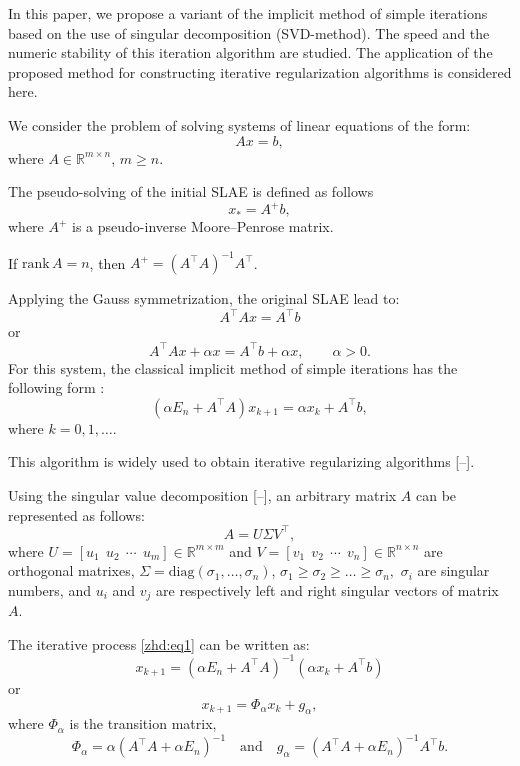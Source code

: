 In this paper, we propose a variant of the implicit method of simple iterations based on the use of singular decomposition (SVD-method). The speed and the numeric stability of this iteration algorithm are studied. The application of the proposed method for constructing iterative regularization algorithms is considered here.

\smallskip

We consider the problem of solving systems of linear equations of the form:
$$ 
Ax=b,
$$
where $A\in\mathbb{R}^{m \times n}$, $m \geq n$.

The pseudo-solving of the initial SLAE is defined as follows
$$ 
x_*=A^{+}b, 
$$
where $A^+$ is a pseudo-inverse Moore--Penrose matrix.

If $\mathrm{rank}\,A=n$, then $A^{+}=(A^\top A)^{-1}A^\top $.

Applying the Gauss symmetrization, the original SLAE lead to:
$$ 
A^\top Ax=A^\top b 
$$
or
$$ 
A^{\top}Ax+\alpha x=A^\top b+\alpha x, \qquad \alpha>0. 
$$
For this system, the classical implicit method of simple iterations has the following form  \cite{zhdanov:bib:bb1, zhdanov:bib:bb2,  zhdanov:bib:bb16}:
\begin{equation}
\label{zhd:eq1}
(\alpha E_n+A^\top A)x_{k+1}=\alpha x_k+A^\top b, 
\end{equation}
where $k=0, 1, \dots$.

This algorithm is widely used to obtain iterative regularizing algorithms  [--].

Using the singular value decomposition [--], an arbitrary matrix $A$ can be represented as follows:
\begin{equation}
\label{zhd:eq2}
 A=U\Sigma V^\top, 
\end{equation}
where $U=[u_1 \: \: u_2 \: \: \cdots \:\: u_m]\in\mathbb{R}^{m \times m}$ and 
$V=[v_1 \:\: v_2 \:\: \cdots \:\: v_n]\in\mathbb{R}^{n \times n}$ are  orthogonal matrixes,
$\Sigma=\mathrm{diag}(\sigma_1,\dots,\sigma_n)$,
$ \sigma_1\geq\sigma_2\geq\dots\geq\sigma_n, $
$\sigma_i$ are singular numbers, and $u_i$ and $v_j$ are respectively left and right singular vectors of matrix $A$.

The iterative process \eqref{zhd:eq1} can be written as:
$$ 
x_{k+1}=(\alpha E_n+A^\top A)^{-1}(\alpha x_k+A^\top b) 
$$
or
\begin{equation}
\label{zhd:eq3}
 x_{k+1}=\Phi_\alpha x_k+g_\alpha, 
 \end{equation}
where $\Phi_\alpha$ is the transition matrix,
$$ 
\Phi_\alpha=\alpha(A^\top A+\alpha E_n)^{-1}  \quad \mbox{and} \quad
 g_\alpha=(A^\top A+\alpha E_n)^{-1}A^\top b. 
 $$

